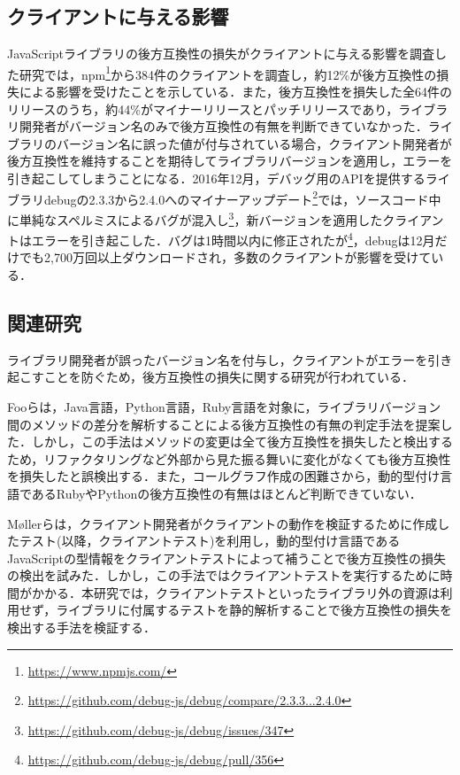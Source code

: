 \documentclass[submit]{ipsj}
\begin{document}
\subsection{クライアントに与える影響}
JavaScriptライブラリの後方互換性の損失がクライアントに与える影響を調査した研究\cite{impact-analysis-for-clients}では，npm\footnote{\url{https://www.npmjs.com/}}から384件のクライアントを調査し，約12\%が後方互換性の損失による影響を受けたことを示している．また，後方互換性を損失した全64件のリリースのうち，約44\%がマイナーリリースとパッチリリースであり，ライブラリ開発者がバージョン名のみで後方互換性の有無を判断できていなかった．ライブラリのバージョン名に誤った値が付与されている場合，クライアント開発者が後方互換性を維持することを期待してライブラリバージョンを適用し，エラーを引き起こしてしまうことになる．2016年12月，デバッグ用のAPIを提供するライブラリdebugの2.3.3から2.4.0へのマイナーアップデート\footnote{\url{https://github.com/debug-js/debug/compare/2.3.3...2.4.0}}では，ソースコード中に単純なスペルミスによるバグが混入し\footnote{\url{https://github.com/debug-js/debug/issues/347}}，新バージョンを適用したクライアントはエラーを引き起こした．バグは1時間以内に修正されたが\footnote{\url{https://github.com/debug-js/debug/pull/356}}，debugは12月だけでも2,700万回以上ダウンロードされ，多数のクライアントが影響を受けている．

\subsection{関連研究}
ライブラリ開発者が誤ったバージョン名を付与し，クライアントがエラーを引き起こすことを防ぐため，後方互換性の損失に関する研究が行われている\cite{How_Do_Api_Evolve}\cite{A_Study_on_Behavioral}\cite{How_to_Break_an_API}．

Fooらは，Java言語，Python言語，Ruby言語を対象に，ライブラリバージョン間のメソッドの差分を解析することによる後方互換性の有無の判定手法を提案した\cite{foo}．しかし，この手法はメソッドの変更は全て後方互換性を損失したと検出するため，リファクタリングなど外部から見た振る舞いに変化がなくても後方互換性を損失したと誤検出する．また，コールグラフ作成の困難さから，動的型付け言語であるRubyやPythonの後方互換性の有無はほとんど判断できていない．

Møllerらは，クライアント開発者がクライアントの動作を検証するために作成したテスト(以降，クライアントテスト)を利用し，動的型付け言語であるJavaScriptの型情報をクライアントテストによって補うことで後方互換性の損失の検出を試みた\cite{type-regression-testing}\cite{model-based-testing}．しかし，この手法ではクライアントテストを実行するために時間がかかる．本研究では，クライアントテストといったライブラリ外の資源は利用せず，ライブラリに付属するテストを静的解析することで後方互換性の損失を検出する手法を検証する．
\end{document}
